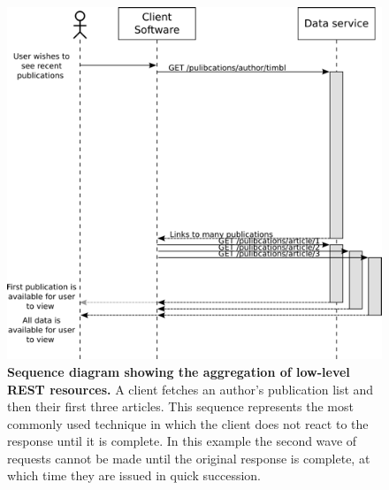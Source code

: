 \documentclass[]{article}
\makeatletter
\def\maxwidth{\ifdim\Gin@nat@width>\linewidth\linewidth
\else\Gin@nat@width\fi}
\let\Oldincludegraphics\includegraphics
\renewcommand{\includegraphics}[1]{\Oldincludegraphics[width=\maxwidth]{#1}}
\makeatother
\begin{document}
\begin{figure}[htbp]
\centering
\includegraphics{images/rest_timeline_1.png}
\caption{\textbf{Sequence diagram showing the aggregation of low-level
REST resources.} A client fetches an author's publication list and then
their first three articles. This sequence represents the most commonly
used technique in which the client does not react to the response until
it is complete. In this example the second wave of requests cannot be
made until the original response is complete, at which time they are
issued in quick succession. \label{rest_timeline_1}}
\end{figure}
\end{document}
